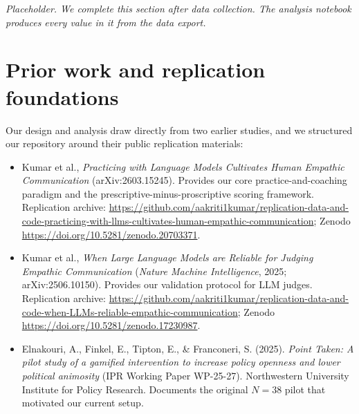 \documentclass[11pt]{article}
\begin{document}
\textit{Placeholder. We complete this section after data collection. The analysis notebook produces every value in it from the data export.}

\section{Prior work and replication foundations}
\label{sec:refs}

Our design and analysis draw directly from two earlier studies, and we structured our repository around their public replication materials:

\begin{itemize}[nosep]
  \item Kumar et al., \emph{Practicing with Language Models Cultivates Human Empathic Communication} (arXiv:2603.15245). Provides our core practice-and-coaching paradigm and the prescriptive-minus-proscriptive scoring framework. Replication archive: \url{https://github.com/aakriti1kumar/replication-data-and-code-practicing-with-llms-cultivates-human-empathic-communication}; Zenodo \url{https://doi.org/10.5281/zenodo.20703371}.
  \item Kumar et al., \emph{When Large Language Models are Reliable for Judging Empathic Communication} (\emph{Nature Machine Intelligence}, 2025; arXiv:2506.10150). Provides our validation protocol for LLM judges. Replication archive: \url{https://github.com/aakriti1kumar/replication-data-and-code-when-LLMs-reliable-empathic-communication}; Zenodo \url{https://doi.org/10.5281/zenodo.17230987}.
  \item Elnakouri, A., Finkel, E., Tipton, E., \& Franconeri, S. (2025). \emph{Point Taken: A pilot study of a gamified intervention to increase policy openness and lower political animosity} (IPR Working Paper WP-25-27). Northwestern University Institute for Policy Research. Documents the original $N = 38$ pilot that motivated our current setup.
\end{itemize}
\end{document}
